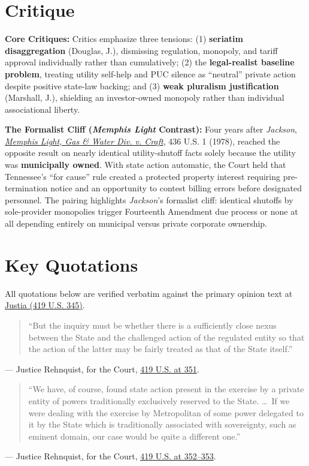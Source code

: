\documentclass[12pt]{article}
\begin{document}
\section{Critique}
\textbf{Core Critiques:} Critics emphasize three tensions: (1) \textbf{seriatim disaggregation} (Douglas, J.), dismissing regulation, monopoly, and tariff approval individually rather than cumulatively; (2) the \textbf{legal-realist baseline problem}, treating utility self-help and PUC silence as ``neutral'' private action despite positive state-law backing; and (3) \textbf{weak pluralism justification} (Marshall, J.), shielding an investor-owned monopoly rather than individual associational liberty.

\textbf{The Formalist Cliff (\textit{Memphis Light} Contrast):} Four years after \emph{Jackson}, \href{https://supreme.justia.com/cases/federal/us/436/1/}{\emph{Memphis Light, Gas \& Water Div. v. Craft}}, 436 U.S. 1 (1978), reached the opposite result on nearly identical utility-shutoff facts solely because the utility was \textbf{municipally owned}. With state action automatic, the Court held that Tennessee's ``for cause'' rule created a protected property interest requiring pre-termination notice and an opportunity to contest billing errors before designated personnel. The pairing highlights \emph{Jackson}'s formalist cliff: identical shutoffs by sole-provider monopolies trigger Fourteenth Amendment due process or none at all depending entirely on municipal versus private corporate ownership.

\section{Key Quotations}
All quotations below are verified verbatim against the primary opinion text at \href{https://supreme.justia.com/cases/federal/us/419/345/}{Justia (419 U.S. 345)}.

\begin{quote}
``But the inquiry must be whether there is a sufficiently close nexus between the State and the challenged action of the regulated entity so that the action of the latter may be fairly treated as that of the State itself.''
\end{quote}
\noindent --- Justice Rehnquist, for the Court, \href{https://supreme.justia.com/cases/federal/us/419/345/}{419 U.S. at 351}.

\begin{quote}
``We have, of course, found state action present in the exercise by a private entity of powers traditionally exclusively reserved to the State. \dots\ If we were dealing with the exercise by Metropolitan of some power delegated to it by the State which is traditionally associated with sovereignty, such as eminent domain, our case would be quite a different one.''
\end{quote}
\noindent --- Justice Rehnquist, for the Court, \href{https://supreme.justia.com/cases/federal/us/419/345/}{419 U.S. at 352--353}.
\end{document}
